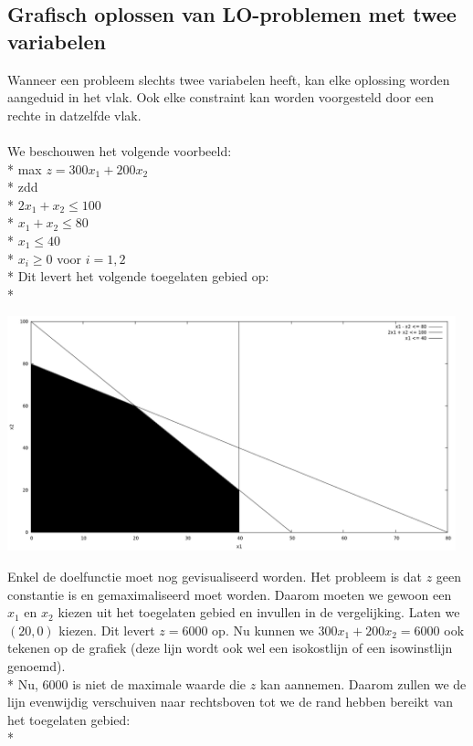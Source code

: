 \documentclass[10pt]{article}
\begin{document}
\subsection{Grafisch oplossen van LO-problemen met twee variabelen}
Wanneer een probleem slechts twee variabelen heeft, kan elke oplossing worden aangeduid in het vlak. Ook elke constraint kan worden voorgesteld door een rechte in datzelfde vlak.\\\\
We beschouwen het volgende voorbeeld:\\*
max $z = 300x_1 + 200x_2$\\*
zdd\\*
$2x_1 + x_2 \le 100$\\*
$x_1 + x_2 \le 80$\\*
$x_1 \le 40$\\*
$x_i \ge 0$ voor $i = 1,2$\\*
Dit levert het volgende toegelaten gebied op:\\*
\begin{center}
\includegraphics[width = 130mm]{geometrie1.png}
\end{center}
Enkel de doelfunctie moet nog gevisualiseerd worden. Het probleem is dat $z$ geen constantie is en gemaximaliseerd moet worden. Daarom moeten we gewoon een $x_1$ en $x_2$ kiezen uit het toegelaten gebied en invullen in de vergelijking. Laten we $(20, 0)$ kiezen. Dit levert $z = 6000$ op. Nu kunnen we $300x_1 + 200x_2 = 6000$ ook tekenen op de grafiek (deze lijn wordt ook wel een isokostlijn of een isowinstlijn genoemd).\\*
Nu, 6000 is niet de maximale waarde die $z$ kan aannemen. Daarom zullen we de lijn evenwijdig verschuiven naar rechtsboven tot we de rand hebben bereikt van het toegelaten gebied:\\*
\end{document}
